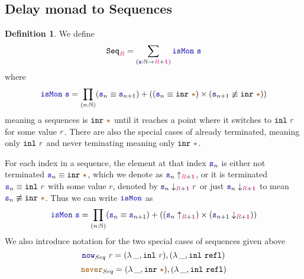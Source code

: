 \documentclass[twoside,11pt,openright]{report}
\theoremstyle{plain} %
\theoremstyle{definition}
\newtheorem{defn}{Definition}[section]
\theoremstyle{remark}
\newcommand*{\term}[1]{\textcolor{green!30!black}{#1}} %
\newcommand*{\type}[1]{\textcolor{magenta!90!black}{#1}}
\newcommand*{\unit}{\type{\textbf{1}}}
\newcommand*{\constant}[1]{\textcolor{orange!60!black}{\ensuremath{\mathtt{#1}}}}
\newcommand*{\function}[1]{\textcolor{blue!60!black}{\ensuremath{\mathtt{#1}}}}
\newcommand*{\typeformer}[1]{\ensuremath{\mathtt{#1}}}
\newcommand*{\unitelem}{\constant{\star}} %
\begin{document}
\subsection{Delay monad to Sequences}
\begin{defn}
  We define
  \begin{equation}
    \typeformer{Seq}_{\type{R}} = \sum_{(\function{s} : \mathbb{N} \rightarrow \type{R} + \unit)} \function{isMon}~\function{s}
  \end{equation}
  where
  \begin{equation}
    \function{isMon}~\function{s} = \prod_{(n : \mathbb{N})} (\function{s}_n \equiv \function{s}_{n+1})  + ((\function{s}_n \equiv \mathtt{inr}~\unitelem) \times (\function{s}_{n+1} \not\equiv \mathtt{inr}~\unitelem))
  \end{equation}
  meaning a sequences is \(\mathtt{inr}~\unitelem\) until it reaches a point where it switches to \(\mathtt{inl}~\term{r}\) for some value \(\term{r}\). There are also the special cases of already terminated, meaning only \(\mathtt{inl}~\term{r}\) and never teminating meaning only \(\mathtt{inr}~\unitelem\).
\end{defn}
\noindent For each index in a sequence, the element at that index \(\function{s}_n\) is either not terminated \(\function{s}_n \equiv \mathtt{inr}~\unitelem\), which we denote as \(\function{s}_n \uparrow_{\type{R} + \unit}\), or it is terminated \(\function{s}_n \equiv \mathtt{inl}~\term{r}\) with some value \(r\), denoted by \(\function{s}_n \downarrow_{\type{R} + \unit} \term{r}\) or just \(\function{s}_n \downarrow_{\type{R} + \unit}\) to mean \(\function{s}_n \not\equiv \mathtt{inr}~\unitelem\). Thus we can write \(\function{isMon}\) as
\begin{equation}
  \function{isMon}~\function{s} = \prod_{(n : \mathbb{N})} (\function{s}_n \equiv \function{s}_{n+1})  + ((\function{s}_n \uparrow_{\type{R} + \unit}) \times (\function{s}_{n+1} \downarrow_{\type{R} + \unit}))
\end{equation}
We also introduce notation for the two special cases of sequences given above
\begin{equation}
  \function{now}_{Seq}~\term{r} = (\lambda\,\_, \mathtt{inl}~\term{r}) , (\lambda\,\_, \mathtt{inl}~\mathtt{refl})
\end{equation}
\begin{equation}
  \constant{never}_{Seq} = (\lambda\,\_, \mathtt{inr}~\unitelem) , (\lambda\,\_, \mathtt{inl}~\mathtt{refl})
\end{equation}
\end{document}
